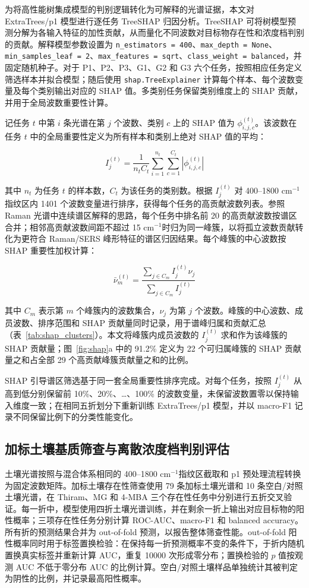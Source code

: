 \documentclass[preprint,12pt]{elsarticle}
\newcommand{\cmone}{cm$^{-1}$}
\begin{document}
为将高性能树集成模型的判别逻辑转化为可解释的光谱证据，本文对 ExtraTrees/p1 模型进行逐任务 TreeSHAP 归因分析。TreeSHAP 可将树模型预测分解为各输入特征的加性贡献，从而量化不同波数对目标物存在性和浓度档判别的贡献\cite{ref17}。解释模型参数设置为 \texttt{n\_estimators = 400}、\texttt{max\_depth = None}、\texttt{min\_samples\_leaf = 2}、\texttt{max\_features = sqrt}、\texttt{class\_weight = balanced}，并固定随机种子。对于 P1、P2、P3、G1、G2 和 G3 六个任务，按照相应任务定义筛选样本并拟合模型；随后使用 \texttt{shap.TreeExplainer} 计算每个样本、每个波数变量及每个类别输出对应的 SHAP 值。多类别任务保留类别维度上的 SHAP 贡献，并用于全局波数重要性计算。

记任务 \(t\) 中第 \(i\) 条光谱在第 \(j\) 个波数、类别 \(c\) 上的 SHAP 值为 \(\phi_{i,j,c}^{(t)}\)。该波数在任务 \(t\) 中的全局重要性定义为所有样本和类别上绝对 SHAP 值的平均：

\[
I_j^{(t)}=\frac{1}{n_t C_t}\sum_{i=1}^{n_t}\sum_{c=1}^{C_t}\left|\phi_{i,j,c}^{(t)}\right|
\]

其中 \(n_t\) 为任务 \(t\) 的样本数，\(C_t\) 为该任务的类别数。根据 \(I_j^{(t)}\) 对 400–1800 \cmone 指纹区内 1401 个波数变量进行排序，获得每个任务的高贡献波数列表。参照 Raman 光谱中连续谱区解释的思路\cite{ref8,ref9}，每个任务中排名前 20 的高贡献波数按谱区合并；相邻高贡献波数间距不超过 15 \cmone 时归为同一峰簇，以将孤立波数贡献转化为更符合 Raman/SERS 峰形特征的谱区归因结果。每个峰簇的中心波数按 SHAP 重要性加权计算：

\[
\bar{\nu}_m^{(t)}=\frac{\sum_{j\in C_m} I_j^{(t)}\nu_j}{\sum_{j\in C_m} I_j^{(t)}}
\]

其中 \(C_m\) 表示第 \(m\) 个峰簇内的波数集合，\(\nu_j\) 为第 \(j\) 个波数。峰簇的中心波数、成员波数、排序范围和 SHAP 贡献量同时记录，用于谱峰归属和贡献汇总（表~\ref{tab:shap_clusters}）。本文将峰簇内成员波数的 \(I_j^{(t)}\) 求和作为该峰簇的 SHAP 贡献量；图~\ref{fig:shap}a 中的 91.2\% 定义为 22 个可归属峰簇的 SHAP 贡献量之和占全部 29 个高贡献峰簇贡献量之和的比例。

SHAP 引导谱区筛选基于同一套全局重要性排序完成。对每个任务，按照 \(I_j^{(t)}\) 从高到低分别保留前 10\%、20\%、…、100\% 的波数变量，未保留波数置零以保持输入维度一致；在相同五折划分下重新训练 ExtraTrees/p1 模型，并以 macro-F1 记录不同保留比例下的分类性能变化。

\subsection{加标土壤基质筛查与离散浓度档判别评估}

土壤光谱按照与混合体系相同的 400–1800 \cmone 指纹区截取和 p1 预处理流程转换为固定波数矩阵。加标土壤存在性筛查使用 79 条加标土壤光谱和 10 条空白/对照土壤光谱，在 Thiram、MG 和 4-MBA 三个存在性任务中分别进行五折交叉验证。每一折中，模型使用四折土壤光谱训练，并在剩余一折上输出对应目标物的阳性概率；三项存在性任务分别计算 ROC-AUC、macro-F1 和 balanced accuracy。所有折的预测结果合并为 out-of-fold 预测，以报告整体筛查性能。out-of-fold 阳性概率同时用于标签置换检验：在保持每一折预测概率不变的条件下，于折内随机置换真实标签并重新计算 AUC，重复 10000 次形成零分布；置换检验的 \(p\) 值按观测 AUC 不低于零分布 AUC 的比例计算。空白/对照土壤样品单独统计其被判定为阴性的比例，并记录最高阳性概率。
\end{document}
